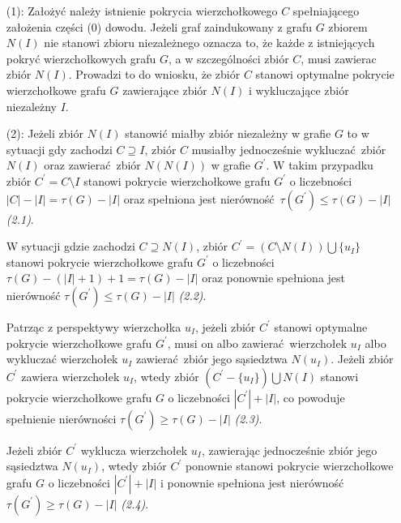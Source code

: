 {\begin{bproof}
\begin{itemize}
      W sytuacji gdy $I = X$, w związku z faktem, że $Y \neq \emptyset$, tak jak w poprzednim przypadku spełniona jest nierówność $|Y|\geq|I|-|X|+1$.
      Ponieważ zbiór $I$ jest niezależny w grafie $G$, zastąpienie zbioru $Y \bigcup X$ zbiorem $N(I)$ w pokryciu wierzchołkowym $C$ owocuje pokryciem wierzchołkowym $C^\prime$ grafu $G$ o liczebności $|C^\prime| \leq |C|$.
      Wobec tego toku rozumowania łatwo zauważyć, że zbiór $C^\prime$ stanowi pokrycie wierzchołkowe grafu $G$ o najmniejszej liczebności, które zawiera zbiór $N(I)$ oraz wyłącza zbiór niezależny $I$.
      \item[(1):] Założyć należy istnienie pokrycia wierzchołkowego $C$ spełniającego założenia części (0) dowodu.
      Jeżeli graf zaindukowany z grafu $G$ zbiorem $N(I)$ nie stanowi zbioru niezależnego oznacza to, że każde z istniejących pokryć wierzchołkowych grafu $G$, a w szczególności zbiór $C$, musi zawierac zbiór $N(I)$.
      Prowadzi to do wniosku, że zbiór $C$ stanowi optymalne pokrycie wierzchołkowe grafu $G$ zawierające zbiór $N(I)$ i wykluczające zbiór niezależny $I$.
      \item[(2):] Jeżeli zbiór $N(I)$ stanowić miałby zbiór niezależny w grafie $G$ to w sytuacji gdy zachodzi $C \supseteq I$, zbiór $C$ musiałby jednocześnie wykluczać zbiór $N(I)$ oraz zawierać zbiór $N(N(I))$ w grafie $G^\prime$.
      W takim przypadku zbiór $C^\prime=C \setminus I$ stanowi pokrycie wierzchołkowe grafu $G^\prime$ o liczebności $|C|-|I|=\tau(G)-|I|$ oraz spełniona jest nierówność $\tau(G^\prime)\leq\tau(G)-|I|$ \textit{(2.1)}.

      W sytuacji gdzie zachodzi $C \supseteq N(I)$, zbiór $C^\prime=(C \setminus N(I))\bigcup\{u_I\}$ stanowi pokrycie wierzchołkowe grafu $G^\prime$ o liczebności $\tau(G)-(|I|+1)+1=\tau(G)-|I|$ oraz ponownie spełniona jest nierówność $\tau(G^\prime)\leq\tau(G)-|I|$ \textit{(2.2)}.

      Patrząc z perspektywy wierzchołka $u_I$, jeżeli zbiór $C^\prime$ stanowi optymalne pokrycie wierzchołkowe grafu $G^\prime$, musi on albo zawierać wierzchołek $u_I$ albo wykluczać wierzchołek $u_I$ zawierać zbiór jego sąsiedztwa $N(u_I)$.
      Jeżeli zbiór $C^\prime$ zawiera wierzchołek $u_I$, wtedy zbiór $(C^\prime - \{u_I\}) \bigcup N(I)$ stanowi pokrycie wierzchołkowe grafu $G$ o liczebności $|C^\prime|+|I|$, co powoduje spełnienie nierówności $\tau(G^\prime)\geq \tau(G)-|I|$ \textit{(2.3)}.

      Jeżeli zbiór $C^\prime$ wyklucza wierzchołek $u_I$, zawierając jednocześnie zbiór jego sąsiedztwa $N(u_I)$, wtedy zbiór $C^\prime$ ponownie stanowi pokrycie wierzchołkowe grafu $G$ o liczebności $|C^\prime|+|I|$ i ponownie spełniona jest nierówność $\tau(G^\prime)\geq \tau(G)-|I|$ \textit{(2.4)}.


\end{itemize}
\end{bproof}}
